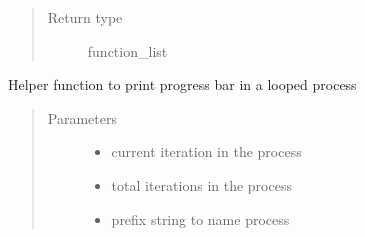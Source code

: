 \documentclass[letterpaper,10pt,english]{sphinxmanual}
\begin{document}
\begin{fulllineitems}
\begin{fulllineitems}
\begin{quote}
\begin{description}
\begin{description}
\end{description}


\item[{Return type}] \leavevmode
function\_list

\end{description}\end{quote}

\end{fulllineitems}


\begin{fulllineitems}
\label{\detokenize{nloed:nloed.model.Model._progress_bar}}
Helper function to print progress bar in a looped process
\begin{quote}\begin{description}
\item[{Parameters}] \leavevmode\begin{itemize}
\item {} 
 \textendash{} current iteration in the process

\item {} 
 \textendash{} total iterations in the process

\item {} 
 \textendash{} prefix string to name process

\end{itemize}

\end{description}\end{quote}

\end{fulllineitems}



\end{fulllineitems}
\end{document}
